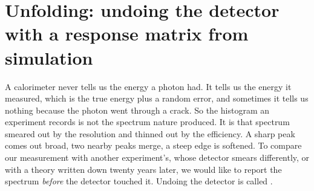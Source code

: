 \providecommand{\SixBUfRmsMin}{}\renewcommand{\SixBUfRmsMin}{72.6}
\providecommand{\SixBUfRmsPoisson}{}\renewcommand{\SixBUfRmsPoisson}{31.6}
\providecommand{\SixBUfTikChiTrue}{}\renewcommand{\SixBUfTikChiTrue}{60.9}
\providecommand{\SixBUfKbest}{}\renewcommand{\SixBUfKbest}{20}
\providecommand{\SixBUfMSEibu}{}\renewcommand{\SixBUfMSEibu}{2969}
\providecommand{\SixBUfRmsIbu}{}\renewcommand{\SixBUfRmsIbu}{54.5}
\providecommand{\SixBUfItLast}{}\renewcommand{\SixBUfItLast}{500}
\providecommand{\SixBUfMSEibuLast}{}\renewcommand{\SixBUfMSEibuLast}{31300}
\providecommand{\SixBUfCfBiasPeak}{}\renewcommand{\SixBUfCfBiasPeak}{-23.3}
\providecommand{\SixBUfCfBiasDip}{}\renewcommand{\SixBUfCfBiasDip}{87.4}
\providecommand{\SixBUfInvBiasPull}{}\renewcommand{\SixBUfInvBiasPull}{1.98}
\providecommand{\SixBUfNtoy}{}\renewcommand{\SixBUfNtoy}{2000}
\providecommand{\SixBUfNominal}{}\renewcommand{\SixBUfNominal}{68.3}
\providecommand{\SixBUfCovInvMean}{}\renewcommand{\SixBUfCovInvMean}{67.9}
\providecommand{\SixBUfCovTikMean}{}\renewcommand{\SixBUfCovTikMean}{46.1}
\providecommand{\SixBUfCovTikMin}{}\renewcommand{\SixBUfCovTikMin}{19.7}
\providecommand{\SixBUfCovIbuMean}{}\renewcommand{\SixBUfCovIbuMean}{53.4}
\providecommand{\SixBUfCovIbuMin}{}\renewcommand{\SixBUfCovIbuMin}{14.4}
\providecommand{\SixBUfCovCfMean}{}\renewcommand{\SixBUfCovCfMean}{0.1}
\providecommand{\SixBUfCovCfMin}{}\renewcommand{\SixBUfCovCfMin}{0}
\providecommand{\SixBUfCovTikPeak}{}\renewcommand{\SixBUfCovTikPeak}{28.8}
\providecommand{\SixBUfCovIbuPeak}{}\renewcommand{\SixBUfCovIbuPeak}{67.2}
\providecommand{\SixBUfCovSe}{}\renewcommand{\SixBUfCovSe}{1}
 \section{Unfolding: undoing the detector with a response matrix from simulation}
\label{6b:sec:unfolding}

A calorimeter never tells us the energy a photon had. It tells us the energy it measured,
which is the true energy plus a random error, and sometimes it tells us nothing because the
photon went through a crack. So the histogram an experiment records is not the spectrum
nature produced. It is that spectrum smeared out by the resolution and thinned out by the
efficiency. A sharp peak comes out broad, two nearby peaks merge, a steep edge is
softened. To compare our measurement with another experiment's, whose detector smears
differently, or with a theory written down twenty years later, we would like to report the
spectrum \emph{before} the detector touched it. Undoing the detector is called
 .

